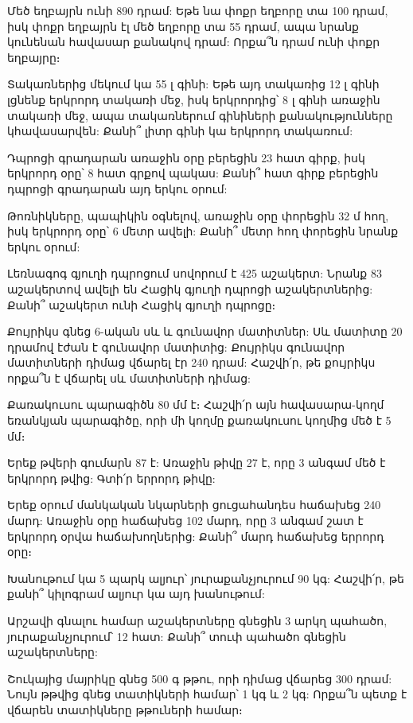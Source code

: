 \problem
Մեծ եղբայրն ունի 890 դրամ: Եթե նա փոքր եղբորը տա 100 դրամ, 
իսկ փոքր եղբայրն էլ մեծ եղբորը տա 55 դրամ, ապա նրանք կունենան 
հավասար քանակով դրամ: Որքա՞ն դրամ ունի փոքր եղբայրը։

\problem
Տակառներից մեկում կա 55 լ գինի: Եթե այդ տակառից 12 լ 
գինի լցնենք երկրորդ տակառի մեջ, իսկ երկրորդից՝ 8 լ գինի 
առաջին տակառի մեջ, ապա տակառներում գինիների քանակությունները 
կհավասարվեն: Քանի՞ լիտր գինի կա երկրորդ տակառում:

\problem
Դպրոցի գրադարան առաջին օրը բերեցին 23 հատ գիրք, իսկ երկրորդ 
օրը՝ 8 հատ գրքով պակաս: Քանի՞ հատ գիրք բերեցին դպրոցի գրադարան 
այդ երկու օրում:

\problem
Թոռնիկները, պապիկին օգնելով, առաջին օրը փորեցին 32 մ հող, իսկ 
երկրորդ օրը՝ 6 մետր ավելի: Քանի՞ մետր հող փորեցին նրանք երկու օրում:

\problem
Լեռնագոգ գյուղի դպրոցում սովորում է 425 աշակերտ: Նրանք 83 
աշակերտով ավելի են Հացիկ գյուղի դպրոցի աշակերտներից: Քանի՞ 
աշակերտ ունի Հացիկ գյուղի դպրոցը։

\problem
Քույրիկս գնեց 6-ական սև և գունավոր մատիտներ: Սև մատիտը 20 
դրամով էժան է գունավոր մատիտից: Քույրիկս գունավոր մատիտների 
դիմաց վճարել էր 240 դրամ: Հաշվի՛ր, թե քույրիկս որքա՞ն է վճարել 
սև մատիտների դիմաց:

\problem
Քառակուսու պարագիծն 80 մմ է։ Հաշվի՛ր այն հավասարա-կողմ եռանկյան 
պարագիծը, որի մի կողմը քառակուսու կողմից մեծ է 5 մմ։

\problem
Երեք թվերի գումարն 87 է: Առաջին թիվը 27 է, որը 3 անգամ մեծ է 
երկրորդ թվից: Գտի՛ր երրորդ թիվը:

\problem
Երեք օրում մանկական նկարների ցուցահանդես հաճախեց 240 մարդ: Առաջին 
օրը հաճախեց 102 մարդ, որը 3 անգամ շատ է երկրորդ օրվա հաճախողներից: 
Քանի՞ մարդ հաճախեց երրորդ օրը։





\problem
Խանութում կա 5 պարկ ալյուր՝ յուրաքանչյուրում 90 կգ: Հաշվի՛ր, թե 
քանի՞ կիլոգրամ ալյուր կա այդ խանութում:

\problem
Արշավի գնալու համար աշակերտները գնեցին 3 արկղ պահածո, յուրաքանչյուրում՝ 
12 հատ: Քանի՞ տուփ պահածո գնեցին աշակերտները:

\problem
Շուկայից մայրիկը գնեց 500 գ թթու, որի դիմաց վճարեց 300 դրամ: Նույն 
թթվից գնեց տատիկների համար՝ 1 կգ և 2 կգ: Որքա՞ն պետք է վճարեն 
տատիկները թթուների համար։





\bye
